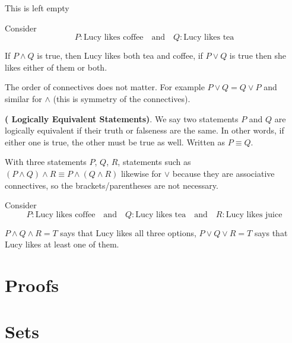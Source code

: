 \begin{remark}
    This is left empty
\end{remark}

\begin{example}
    Consider
    $$
    P: \text{Lucy likes coffee} \quad \text{and} \quad Q: \text{Lucy likes tea}
    $$

    If $P \land Q$ is true, then Lucy likes both tea and coffee, if $P \lor Q$ is true then she likes either of them or both.
\end{example}

The order of connectives does not matter. For example $P \lor Q = Q \lor P$ and similar for $\land$ (this is symmetry of the connectives).

\begin{definition} \textbf{( Logically Equivalent Statements)}. We say two statements $P$ and $Q$ are logically equivalent if their truth or falseness are the same. In other words, if either one is true, the other must be true as well. Written as $P \equiv Q$.
\end{definition}

With three statements $P$, $Q$, $R$, statements such as $(P \land Q) \land R \equiv P \land (Q \land R)$ likewise for $\lor$ because they are associative connectives, so the brackets/parentheses are not necessary. 

\begin{example}
    Consider 
    $$ 
    P: \text{Lucy likes coffee} \quad \text{and} \quad Q: \text{Lucy likes tea} \quad \text{and} \quad R: \text{Lucy likes juice}
    $$

    $P \land Q \land R = T$ says that Lucy likes all three options, $P \lor Q \lor R = T$ says that Lucy likes at least one of them.
\end{example}

\section{Proofs}

\section{Sets}

